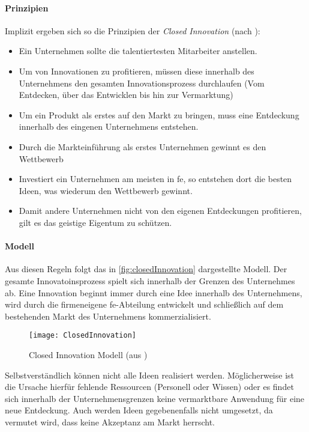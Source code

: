 \paragraph{Prinzipien}
Implizit ergeben sich so die Prinzipien der \textit{Closed Innovation} (nach \cite[19]{herzog2011}):
\begin{itemize}
    \item Ein Unternehmen sollte die talentiertesten Mitarbeiter anstellen.
    \item Um von Innovationen zu profitieren, müssen diese innerhalb des Unternehmens den gesamten Innovationsprozess durchlaufen (Vom Entdecken, über das Entwicklen bis hin zur Vermarktung)
    \item Um ein Produkt als erstes auf den Markt zu bringen, muss eine Entdeckung innerhalb des eingenen Unternehmens entstehen.
    \item Durch die Markteinführung als erstes Unternehmen gewinnt es den Wettbewerb
    \item Investiert ein Unternehmen am meisten in \ac{fe}, so entstehen dort die besten Ideen, was wiederum den Wettbewerb gewinnt.
    \item Damit andere Unternehmen nicht von den eigenen Entdeckungen profitieren, gilt es das geistige Eigentum zu schützen.
\end{itemize}

\paragraph{Modell}
Aus diesen Regeln folgt das in \autoref{fig:closedInnovation} dargestellte Modell.
Der gesamte Innovatoinsprozess spielt sich innerhalb der Grenzen des Unternehmes ab.
Eine Innovation beginnt immer durch eine Idee innerhalb des Unternehmens,
wird durch die firmeneigene \ac{fe}-Abteilung entwickelt
und schließlich auf dem bestehenden Markt des Unternehmens kommerzialisiert.

\begin{figure}[ht!]
    \centering
    \texttt{[image: ClosedInnovation]}
    \caption{Closed Innovation Modell (aus \cite[20]{herzog2011})}
    \label{fig:closedInnovation}
\end{figure}

Selbstverständlich können nicht alle Ideen realisiert werden.
Möglicherweise ist die Ursache hierfür fehlende Ressourcen (Personell oder Wissen)
oder es findet sich innerhalb der Unternehmensgrenzen keine vermarktbare Anwendung für eine neue Entdeckung.
Auch werden Ideen gegebenenfalls nicht umgesetzt, da vermutet wird, dass keine Akzeptanz am Markt herrscht.

